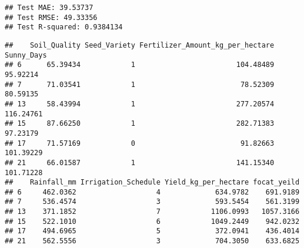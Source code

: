 \documentclass[
]{article}
\newenvironment{Shaded}{\begin{snugshade}}{\end{snugshade}}
\newcommand{\AttributeTok}[1]{\textcolor[rgb]{0.13,0.29,0.53}{#1}}
\newcommand{\CommentTok}[1]{\textcolor[rgb]{0.56,0.35,0.01}{\textit{#1}}}
\newcommand{\DecValTok}[1]{\textcolor[rgb]{0.00,0.00,0.81}{#1}}
\newcommand{\FloatTok}[1]{\textcolor[rgb]{0.00,0.00,0.81}{#1}}
\newcommand{\FunctionTok}[1]{\textcolor[rgb]{0.13,0.29,0.53}{\textbf{#1}}}
\newcommand{\NormalTok}[1]{#1}
\newcommand{\OtherTok}[1]{\textcolor[rgb]{0.56,0.35,0.01}{#1}}
\newcommand{\SpecialCharTok}[1]{\textcolor[rgb]{0.81,0.36,0.00}{\textbf{#1}}}
\newcommand{\StringTok}[1]{\textcolor[rgb]{0.31,0.60,0.02}{#1}}
\begin{document}
\begin{verbatim}
## Test MAE: 39.53737 
## Test RMSE: 49.33356 
## Test R-squared: 0.9384134
\end{verbatim}

\begin{Shaded}
\end{Shaded}

\begin{verbatim}
##    Soil_Quality Seed_Variety Fertilizer_Amount_kg_per_hectare Sunny_Days
## 6      65.39434            1                        104.48489   95.92214
## 7      71.03541            1                         78.52309   80.59135
## 13     58.43994            1                        277.20574  116.24761
## 15     87.66250            1                        282.71383   97.23179
## 17     71.57169            0                         91.82663  101.39229
## 21     66.01587            1                        141.15340  101.71228
##    Rainfall_mm Irrigation_Schedule Yield_kg_per_hectare focat_yeild
## 6     462.0362                   4             634.9782    691.9189
## 7     536.4574                   3             593.5454    561.3199
## 13    371.1852                   7            1106.0993   1057.3166
## 15    522.1010                   6            1049.2449    942.0232
## 17    494.6965                   5             372.0941    436.4014
## 21    562.5556                   3             704.3050    633.6825
\end{verbatim}

\begin{Shaded}
\end{Shaded}
\end{document}

